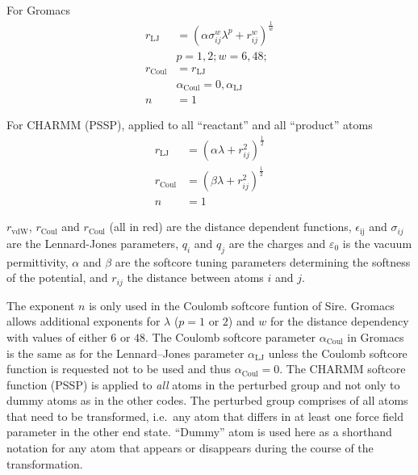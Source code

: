 \documentclass[journal=jctcce,manuscript=suppinfo]{achemso}
\begin{document}
For Gromacs
\begin{equation}
  \begin{split}
    r_{\mathrm{LJ}} &= (\alpha \sigma_{ij}^{w} \lambda^{p} +
    r_{ij}^{w})^{\frac{1}{w}} \\
    &p = 1,2; w = 6,48; \\
    r_{\mathrm{Coul}} &= r_{\mathrm{LJ}} \\
    &\alpha_{\mathrm{Coul}} = 0,\alpha_{\mathrm{LJ}} \\
    n &= 1
  \end{split}
  \label{eq:Gromacs}
\end{equation}

For CHARMM (PSSP), applied to all ``reactant'' and all ``product'' atoms
\begin{equation}
  \begin{split}
    r_{\mathrm{LJ}} &= (\alpha \lambda + r_{ij}^2)^{\frac{1}{2}} \\
    r_{\mathrm{Coul}} &= (\beta\lambda + r_{ij}^{2})^{\frac{1}{2}} \\
    n &= 1
   \end{split}
  \label{eq:CHARMM}
\end{equation}

$r_{\mathrm{vdW}}$, $r_{\mathrm{Coul}}$ and $r_{\mathrm{Coul}}$ (all in red) 
are the distance dependent functions, $\epsilon_{\mathrm{ij}}$ and
$\sigma_{ij}$ are the Lennard-Jones parameters, $q_{i}$ and $q_{j}$
are the charges and $\varepsilon_{0}$ is the vacuum permittivity,
$\alpha$ and $\beta$ are the softcore tuning parameters determining
the softness of the potential, and $r_{ij}$ the distance between
atoms $i$ and $j$.

The exponent $n$ is only used in the Coulomb softcore funtion of Sire.
Gromacs allows additional exponents for $\lambda$ ($p = 1$ or $2$) and
$w$ for the distance dependency with values of either $6$ or $48$.
The Coulomb softcore parameter $\alpha_{\mathrm{Coul}}$ in Gromacs is
the same as for the Lennard--Jones parameter $\alpha_{\mathrm{LJ}}$
unless the Coulomb softcore function is requested not to be used and thus 
$\alpha_{\mathrm{Coul}} = 0$.  The
CHARMM softcore function (PSSP) is applied to \emph{all} atoms in the
perturbed group and not only to dummy atoms as in the other codes.
The perturbed group comprises of all atoms that need to be
transformed, i.e.\ any atom that differs in at least one force field
parameter in the other end state.  ``Dummy'' atom is used here as a
shorthand notation for any atom that appears or disappears during the
course of the transformation.
\end{document}
